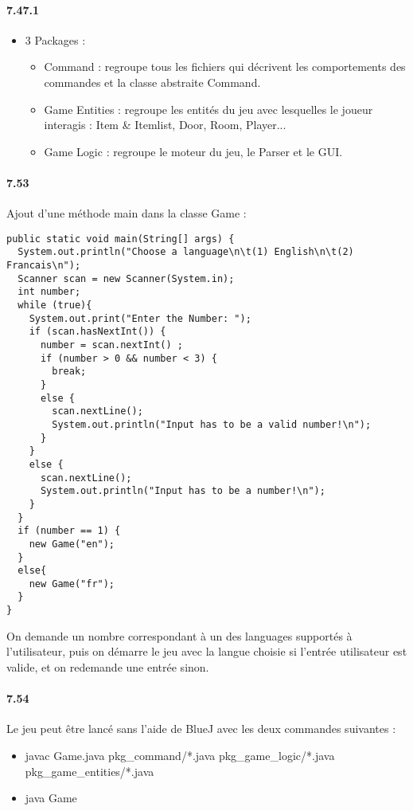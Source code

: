 \documentclass[11pt,a4paper]{report}
\begin{document}
\paragraph{7.47.1}
\begin{itemize}
\item 3 Packages :
\begin{itemize}
\item Command : regroupe tous les fichiers qui décrivent les comportements des commandes et la classe abstraite Command.
\item Game Entities : regroupe les entités du jeu avec lesquelles le joueur interagis : Item \& Itemlist, Door, Room, Player...
\item Game Logic  : regroupe le moteur du jeu, le Parser et le GUI.
\end{itemize}
\end{itemize}

\paragraph{7.53}
Ajout d'une méthode main dans la classe Game :
\begin{lstlisting}
public static void main(String[] args) {
  System.out.println("Choose a language\n\t(1) English\n\t(2) Francais\n");
  Scanner scan = new Scanner(System.in);
  int number;
  while (true){
    System.out.print("Enter the Number: ");
    if (scan.hasNextInt()) {
      number = scan.nextInt() ;
      if (number > 0 && number < 3) {
        break;
      }
      else {
        scan.nextLine();
        System.out.println("Input has to be a valid number!\n");
      }
    }
    else {
      scan.nextLine();
      System.out.println("Input has to be a number!\n");
    }
  }
  if (number == 1) {
    new Game("en");
  }
  else{
    new Game("fr");
  }
}
\end{lstlisting}
On demande un nombre correspondant à un des languages supportés à l'utilisateur, puis on démarre le jeu avec la langue choisie si l'entrée utilisateur est valide, et on redemande une entrée sinon.

\paragraph{7.54}
Le jeu peut être lancé sans l'aide de BlueJ avec les deux commandes suivantes :
\begin{itemize}
\item javac Game.java pkg\_command/*.java pkg\_game\_logic/*.java pkg\_game\_entities/*.java
\item java Game
\end{itemize}
\end{document}
